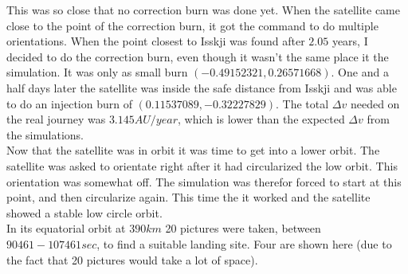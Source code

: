 \documentclass[a4paper, 10pt]{article}
\begin{document}
This was so close that no correction burn was done yet. When the satellite came close to the point of the correction burn, it got the command to do multiple orientations. When the point closest to Isskji was found after $2.05$ years, I decided to do the correction burn, even though it wasn't the same place it the simulation. It was only as small burn $(-0.49152321, 0.26571668)$. One and a half days later the satellite was inside the safe distance from Isskji and was able to do an injection burn of $(0.11537089, -0.32227829)$. The total $\Delta v$ needed on the real journey was $3.145 AU/year$, which is lower than the expected $\Delta v$ from the simulations.\\

Now that the satellite was in orbit it was time to get into a lower orbit. The satellite was asked to orientate right after it had circularized the low orbit. This orientation was somewhat off. The simulation was therefor forced to start at this point, and then circularize again. This time the it worked and the satellite showed a stable low circle orbit.\\

In its equatorial orbit at $390 km$ 20 pictures were taken, between $ 90461-107461 sec$, to find a suitable landing site. Four are shown here (due to the fact that 20 pictures would take a lot of space).
\end{document}
